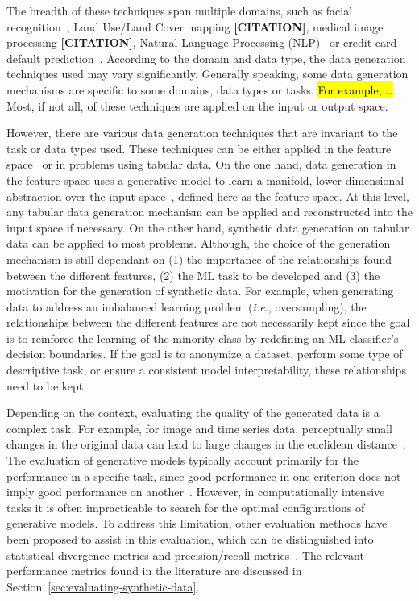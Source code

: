 \documentclass[parskip=full]{scrartcl}
\begin{document}
The breadth of these techniques span multiple domains, such as facial
recognition~\cite{lv2017data}, Land Use/Land Cover mapping
\textbf{[CITATION]}, medical image processing \textbf{[CITATION]}, Natural
Language Processing (NLP)~\cite{feng2021survey} or credit card default
prediction~\cite{alam2020investigation}. According to the domain and data
type, the data generation techniques used may vary significantly. Generally
speaking, some data generation mechanisms are specific to some domains, data
types or tasks. \hl{For example, \ldots}. Most, if not all, of these
techniques are applied on the input or output space.

However, there are various data generation techniques that are invariant to
the task or data types used. These techniques can be either applied in the
feature space~\cite{devries2017dataset} or in problems using tabular data. On
the one hand, data generation in the feature space uses a generative model to
learn a manifold, lower-dimensional abstraction over the input
space~\cite{kingma2019introduction}, defined here as the feature space. At
this level, any tabular data generation mechanism can be applied and
reconstructed into the input space if necessary. On the other hand, synthetic
data generation on tabular data can be applied to most problems. Although, the
choice of the generation mechanism is still dependant on (1) the importance of
the relationships found between the different features, (2) the ML task to be
developed and (3) the motivation for the generation of synthetic data. For
example, when generating data to address an imbalanced learning problem
(\textit{i.e.}, oversampling), the relationships between the different
features are not necessarily kept since the goal is to reinforce the learning
of the minority class by redefining an ML classifier's decision boundaries. If
the goal is to anonymize a dataset, perform some type of descriptive task, or
ensure a consistent model interpretability, these relationships need to be
kept.

Depending on the context, evaluating the quality of the generated data is a
complex task. For example, for image and time series data, perceptually small
changes in the original data can lead to large changes in the euclidean
distance~\cite{assefa2020generating, theis2016note}. The evaluation of
generative models typically account primarily for the performance in a
specific task, since good performance in one criterion does not imply good
performance on another~\cite{theis2016note}. However, in computationally
intensive tasks it is often impracticable to search for the optimal
configurations of generative models. To address this limitation, other
evaluation methods have been proposed to assist in this evaluation, which can
be distinguished into statistical divergence metrics and precision/recall
metrics~\cite{alaa2022faithful}. The relevant performance metrics found in the
literature are discussed in Section~\ref{sec:evaluating-synthetic-data}.
\end{document}
